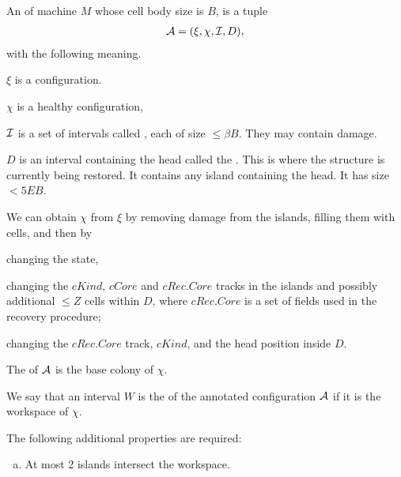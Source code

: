 \documentclass[12pt]{memoir}
\newcommand{\fld}[1]{\ensuremath{\textit{#1}}}
\def\B{B}
\newcommand{\D}{D}
\newcommand{\E}{E}
\newcommand{\pos}{\mathrm{pos}}
\newcommand{\Z}{Z}
\newcommand{\Core}{\fld{Core}}
\newcommand{\cCore}{\fld{cCore}}
\newcommand{\cKind}{\fld{cKind}}
\newcommand{\cRec}{\fld{cRec}}
\begin{document}
\begin{definition}\label{def:annotated-config}
    An  of machine \( M \) whose cell body size is \( \B \),
    is a tuple
         \begin{align*}
             \cA=(\xi,\chi, \cI, \D),
         \end{align*}
    with the following meaning.

    \( \xi \) is a configuration.

    \( \chi \) is a healthy configuration, %

    \( \mathcal{I} \) is a set of intervals called , each of size \( \le\beta\B \).  %
    They may contain damage.

    \( \D \) is an interval containing the head called the .
    This is where the structure is currently being restored.
    It contains any island containing the head.
    It has size \( <5\E\B \). %

    We can obtain \( \chi \) from \( \xi \) by removing damage from the islands,
    filling them with cells, and then by
    \begin{bullets}
         \item changing the state,
         \item changing the \( \cKind \), \( \cCore \)  and \( \cRec.\Core \) tracks
               in the islands and possibly
               additional \( \le \Z \) cells within \( \D \), where
               \( \cRec.\Core \) is a set of fields used in the recovery
               procedure;
         \item changing the \( \cRec.\Core \) track,  \( \cKind \),
           and the head position inside \( \D \).
    \end{bullets}


    The  of \( \mathcal{A} \) is the base colony of \( \chi \).

    We say that an interval \( W \) is the %
     of the annotated
    configuration \( \mathcal{A} \) if it is the %
    workspace of \( \chi \).

    The following additional properties are required:
    \begin{enumerate}[(a)]
        \item \label{i:annotated-config.islands}
          At most 2 islands intersect the workspace.


\end{enumerate}
\end{definition}
\end{document}
